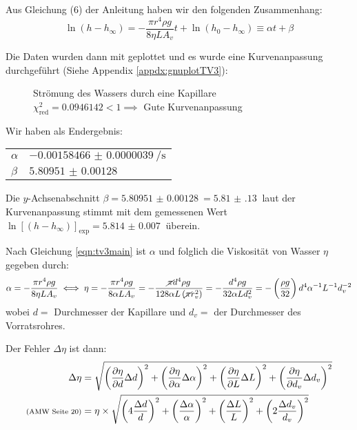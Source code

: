 	Aus Gleichung (6) der Anleitung haben wir den folgenden Zusammenhang:
	\begin{equation}
		\ln\left(h-h_\infty\right) = -\frac{\pi r^4 \rho g}{8\eta L A_v}t + \ln\left(h_0-h_\infty\right) \equiv \alpha t + \beta \label{eqn:tv3main}
	\end{equation}

    \newpage
	Die Daten wurden dann mit \gnuplot{} geplottet und es wurde eine Kurvenanpassung durchgeführt (Siehe Appendix \ref{appdx:gnuplotTV3}):

	\begin{figure}[H]
		\centering
		
		\caption{\centering Strömung des Wassers durch eine Kapillare \captionbr $\chi^2_{\text{red}} = 0.0946142 < 1 \implies$ Gute Kurvenanpassung\vspace{-1em}}
		\label{fig:tvthree-plot}
	\end{figure}

	Wir haben als Endergebnis:
    \begin{center}
        \begin{tabular}{l l}
            \toprule
            $\alpha$ & $\SI{-0.00158466(390)}{\per\second}$ \\
            $\beta$ & $\SI{5.80951(128)}{}$ \\
            \bottomrule
        \end{tabular}
    \end{center}
    \vspace{0.5em}
    Die $y$-Achsenabschnitt $\beta = \SI{5.80951(128)}{} = \SI{5.81(13)}{}$ laut der Kurvenanpassung stimmt mit dem gemessenen Wert $\ln\left[\left(h - h_\infty\right)\right]_{\text{exp}} = \SI{5.814(7)}{}$ überein.

    Nach Gleichung \eqref{eqn:tv3main} ist $\alpha$ und folglich die Viskosität von Wasser $\eta$ gegeben durch:
    \begin{equation}
    	\alpha = -\frac{\pi r^4 \rho g}{8\eta L A_v} \iff \eta = -\frac{\pi r^4 \rho g}{8\alpha L A_v} = -\frac{\cancel{\pi} d^4 \rho g}{128\alpha L \left(\cancel{\pi} r_v^2\right)} = -\frac{d^4 \rho g}{32\alpha L d_v^2} = -\left(\frac{\rho g}{32}\right) d^4\alpha^{-1}L^{-1}d_v^{-2}
    \end{equation}
    wobei $d =$ Durchmesser der Kapillare und $d_v =$ der Durchmesser des Vorratsrohres.
    
    Der Fehler $\Delta \eta$ ist dann:
    \begin{align}
    	\Delta \eta &= \gausserror{\eta}{d, \alpha, L, d_v} \notag \\
    	\text{\scriptsize (AMW Seite 20)} &=  \eta \times \sqrt{\left(4\frac{\Delta d}{d}\right)^2 + \left(\frac{\Delta \alpha}{\alpha}\right)^2 + \left(\frac{\Delta L}{L}\right)^2 + \left(2\frac{\Delta d_v}{d_v}\right)^2} \label{eqn:deltaEta}
    \end{align}

